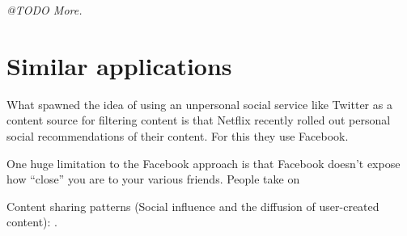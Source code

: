 
\emph{@TODO More.}


\section{Similar applications} %
\label{sec:similar_applications}

What spawned the idea of using an unpersonal social service like Twitter as a content source for filtering content is that Netflix recently rolled out personal social recommendations of their content.
For this they use Facebook.

One huge limitation to the Facebook approach is that Facebook doesn't expose how ``close'' you are to your various friends.
People take on

Content sharing patterns (Social influence and the diffusion of user-created content): \cite{Bakshy2009}.


